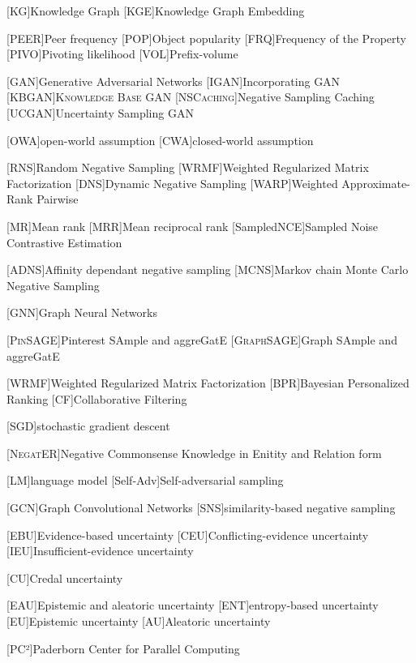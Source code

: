 \begin{acronym}[ECU]

[KG]{Knowledge Graph}
[KGE]{Knowledge Graph Embedding}

[\textsc{PEER}]{Peer frequency}
[\textsc{POP}]{Object popularity }
[\textsc{FRQ}]{Frequency of the Property}
[\textsc{PIVO}]{Pivoting likelihood}
[\textsc{VOL}]{Prefix-volume}

[GAN]{Generative Adversarial Networks}
[\textsc{IGAN}]{Incorporating GAN}
[\textsc{KBGAN}]{\textsc{Knowledge Base GAN}}
[\textsc{NSCaching}]{Negative Sampling Caching}
[\textsc{UCGAN}]{Uncertainty Sampling GAN}

[OWA]{open-world assumption}
[CWA]{closed-world assumption}

[RNS]{Random Negative Sampling}
[WRMF]{Weighted Regularized Matrix Factorization}
[DNS]{Dynamic Negative Sampling}
[WARP]{Weighted Approximate-Rank Pairwise}

[MR]{Mean rank}
[MRR]{Mean reciprocal rank}
[SampledNCE]{Sampled Noise Contrastive Estimation}

[\textsc{ADNS}]{Affinity dependant negative sampling}
[\textsc{MCNS}]{Markov chain Monte Carlo Negative Sampling}
    
[GNN]{Graph Neural Networks}

[\textsc{PinSAGE}]{Pinterest SAmple and aggreGatE}
[\textsc{GraphSAGE}]{Graph SAmple and aggreGatE}


[WRMF]{Weighted Regularized Matrix Factorization}
[BPR]{Bayesian Personalized Ranking}
[CF]{Collaborative Filtering}

[SGD]{stochastic gradient descent}

[\textsc{NegatER}]{Negative Commonsense Knowledge in Enitity and Relation form}

[LM]{language model}
[Self-Adv]{Self-adversarial sampling}

[GCN]{Graph Convolutional Networks}
[SNS]{similarity-based negative sampling}


[EBU]{Evidence-based uncertainty}
[CEU]{Conflicting-evidence uncertainty}
[IEU]{Insufficient-evidence uncertainty}

[CU]{Credal uncertainty}

[EAU]{Epistemic and aleatoric uncertainty}
[ENT]{entropy-based uncertainty}
[EU]{Epistemic uncertainty}
[AU]{Aleatoric uncertainty}
    
[PC²]{Paderborn Center for Parallel Computing}
\end{acronym}